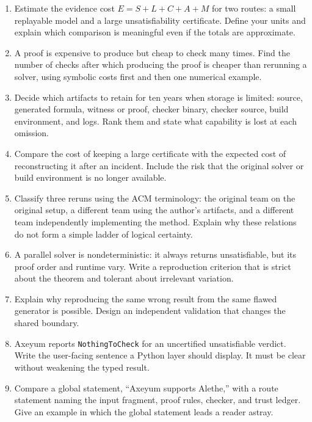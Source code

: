 \begin{enumerate}
\item Estimate the evidence cost
\(E=S+L+C+A+M\) for two routes: a small replayable model and a large
unsatisfiability certificate. Define your units and explain which comparison
is meaningful even if the totals are approximate.

\item A proof is expensive to produce but cheap to check many times. Find the
number of checks after which producing the proof is cheaper than rerunning a
solver, using symbolic costs first and then one numerical example.

\item Decide which artifacts to retain for ten years when storage is limited:
source, generated formula, witness or proof, checker binary, checker source,
build environment, and logs. Rank them and state what capability is lost at
each omission.

\item Compare the cost of keeping a large certificate with the expected cost
of reconstructing it after an incident. Include the risk that the original
solver or build environment is no longer available.

\item Classify three reruns using the ACM terminology: the original team on
the original setup, a different team using the author's artifacts, and a
different team independently implementing the method. Explain why these
relations do not form a simple ladder of logical certainty.

\item A parallel solver is nondeterministic: it always returns
unsatisfiable, but its proof order and runtime vary. Write a reproduction
criterion that is strict about the theorem and tolerant about irrelevant
variation.

\item Explain why reproducing the same wrong result from the same flawed
generator is possible. Design an independent validation that changes the
shared boundary.

\item Axeyum reports \texttt{NothingToCheck} for an uncertified unsatisfiable
verdict. Write the user-facing sentence a Python layer should display. It must
be clear without weakening the typed result.

\item Compare a global statement, ``Axeyum supports Alethe,'' with a route
statement naming the input fragment, proof rules, checker, and trust ledger.
Give an example in which the global statement leads a reader astray.


\end{enumerate}
